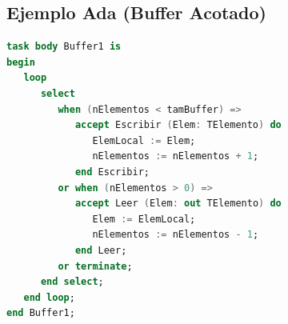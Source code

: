 \subsection{Ejemplo Ada (Buffer Acotado)}
\begin{lstlisting}[language=Ada]
task body Buffer1 is
begin
   loop
      select 
         when (nElementos < tamBuffer) =>
            accept Escribir (Elem: TElemento) do
               ElemLocal := Elem;
               nElementos := nElementos + 1;
            end Escribir;
         or when (nElementos > 0) =>
            accept Leer (Elem: out TElemento) do
               Elem := ElemLocal;
               nElementos := nElementos - 1;
            end Leer;
         or terminate;
      end select;
   end loop;
end Buffer1;
\end{lstlisting}

